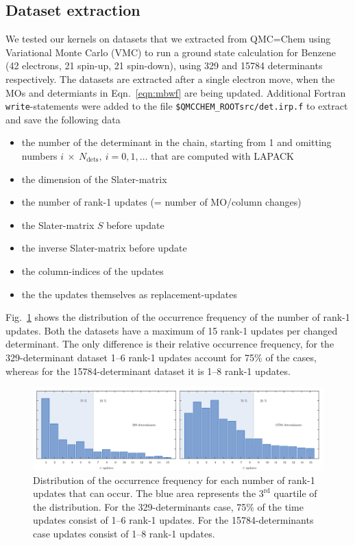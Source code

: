 \documentclass[11pt]{article}
\numberwithin{figure}{section}
\numberwithin{table}{section}
\begin{document}
    \subsection{Dataset extraction}
    	We tested our kernels on datasets that we extracted from QMC=Chem using Variational Monte Carlo (VMC) to run a ground state calculation for Benzene (42 electrons, 21 spin-up, 21 spin-down), using 329 and 15784 determinants respectively. The datasets are extracted after a single electron move, when the MOs and determiants in Eqn.~\ref{eqn:mbwf} are being updated. Additional Fortran \texttt{write}-statements were added to the file \texttt{\$QMCCHEM\_ROOTsrc/det.irp.f} to extract and save the following data
    	\begin{itemize}
    		\item the number of the determinant in the chain, starting from 1 and omitting numbers $i~\times~N_\mathrm{dets},~i=0,1,\ldots$ that are computed with LAPACK
    		\item the dimension of the Slater-matrix
    		\item the number of rank-1 updates (= number of MO/column changes)
    		\item the Slater-matrix $S$ before update
    		\item the inverse Slater-matrix before update
    		\item the column-indices of the updates
    		\item the the updates themselves as replacement-updates
    \end{itemize}
    
    Fig.~\ref{fig:upd_freq} shows the distribution of the occurrence frequency of the number of rank-1 updates. Both the datasets have a maximum of 15 rank-1 updates per changed determinant. The only difference is their relative occurrence frequency, for the 329-determinant dataset 1--6 rank-1 updates account for 75\% of the cases, whereas for the 15784-determinant dataset it is 1--8 rank-1 updates. 
    
    \begin{figure}[h]
    	\centering
    	\includegraphics[width=1\textwidth]{upd_freq_hor.png}
    	\caption{Distribution of the occurrence frequency for each number of rank-1 updates that can occur. The blue area represents the $3^\mathrm{rd}$ quartile of the distribution. For the 329-determinants case, 75\% of the time updates consist of 1--6 rank-1 updates. For the 15784-determinants case updates consist of 1--8 rank-1 updates.}
    	\label{fig:upd_freq}
    \end{figure}
    
\end{document}
